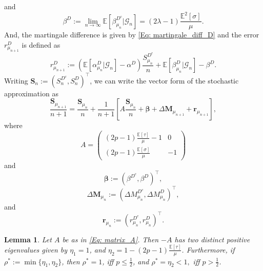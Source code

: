 \documentclass{article}
\numberwithin{equation}{section}
\newtheorem{lemma}[theorem]{Lemma}
\newcommand{\GG}{\mbox{${\mathcal G}$}}
\newcommand{\1}{\mathbf{1}}
\newcommand{\0}{\mathbf{0}}
\newcommand{\bS}{\mathbf{S}}
\newcommand{\bM}{\mathbf{M}}
\newcommand{\br}{\mathbf{r}}
\newcommand{\E}{\mbox{${\mathbb E}$}}
\begin{document}
and 
\begin{equation*}
\label{Eq:beta_D_bounded_times_right_normalisation}
\beta^{D} :=\lim_{n \to \infty}\E[\beta_{\mu_n}^{D^c} \vert \GG_{n}] =(2\lambda-1)\frac{\mathbb{E}^2[\sigma]}{\mu}.
\end{equation*}
And, the martingale difference is given by \eqref{Eq: martingale_diff_D}
and the error $r_{\mu_{n+1}}^{D}$ is defined as 
\begin{equation}
\label{Eq: error_D_mu_n}
r_{\mu_{n+1}}^{D}:= \left(\E\left[\alpha_{\mu_n}^{D} | \GG_{n} \right]-\alpha^{D}\right)\frac{S_{\mu_n}^{D^c}}{n}+ \E \left[\beta_{\mu_n}^{D}| \GG_{n}\right]- \beta^{{D}}.
\end{equation}
Writing $\bS_n:= \left(S_n^{D^c}, S_{n}^D \right)^\top$, we can write the vector form of the stochastic approximation as 
\begin{equation}
\label{Eq: recursion_vector_matrix}
\frac{\bS_{\mu_{n+1}}}{n+1} = \frac{\bS_{\mu_{n}}}{n}+ \frac{1}{n+1} \left[A \frac{\bS_{\mu_{n}}}{n}+ \boldsymbol{\beta}+ \Delta \bM_{\mu_{n+1}} + \br_{\mu_{n+1}}\right], 
\end{equation}
where 
\begin{equation}
\label{Eq: matrix_A}
A = \begin{pmatrix}
     (2p-1)\frac{\E [\tau]}{\mu}-1 & 0\\
     (2p-1)\frac{\E [\sigma]}{\mu} & -1
\end{pmatrix}
\end{equation}
and 
\begin{equation}
\boldsymbol{\beta}:= \left(\beta^{D^c}, \beta ^D\right)^\top,
\end{equation}
\begin{equation}
\label{Eq: martingale_diff_vector}
\Delta \bM_{ \mu_{n}}:= \left(\Delta M_{\mu_n}^{D^c}, \Delta M_{\mu_n}^{D}\right)^\top,
\end{equation}
and 
\begin{equation}
\label{Eq: error_vector}
\br_{ \mu_{n}}:= \left( r_{\mu_n}^{D^c}, r_{\mu_n}^{D}\right)^\top.
\end{equation}
\begin{lemma}
\label{Lem: eigenvalues_of_A}
Let $A$ be as in \eqref{Eq: matrix_A}. Then $-A$ has two distinct positive eigenvalues given by $\eta_1=1$, and $\eta_2= 1-(2p-1)\frac{\E [\tau]}{\mu}$. Furthermore, if $\rho^*:= \min\{\eta_1, \eta_2\}$, then $\rho^* =1$, iff $p \le \frac{1}{2}$, and $\rho^*= \eta_2 <1,$ iff $p > \frac{1}{2}$.
\end{lemma}
\end{document}
